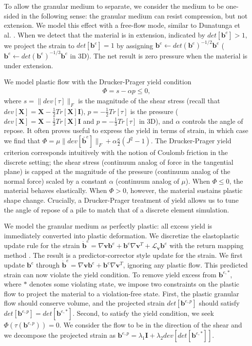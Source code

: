 To allow the granular medium to separate, we consider the medium to be one-sided in the following sense: the granular medium can resist compression, but not extension. We model this effect with a free-flow mode, similar to Dunatunga et al. \cite{Dunatunga:2015:Continuum}. When we detect that the material is in extension, indicated by $det[\bm{b}^e] > 1$, we project the strain to $det[\bm{b}^e] = 1$ by assigning $\bm{b}^e \leftarrow det\left( \bm{b}^e \right)^{-1/2} \bm{b}^e$ ($\bm{b}^e \leftarrow det\left( \bm{b}^e \right)^{-1/3} \bm{b}^e$ in 3D). The net result is zero pressure when the material is under extension.

We model plastic flow with the Drucker-Prager yield condition
\begin{align}
\Phi = s - \alpha p \leq 0,
\end{align}
where $s = \| dev[\tau] \|_F$ is the magnitude of the shear stress (recall that $dev[\bm{X}] = \bm{X} - \frac{1}{2} Tr[\bm{X}] \bm{I}$), $p = -\frac{1}{2}Tr[\tau]$ is the pressure ($dev[\bm{X}] = \bm{X} - \frac{1}{3} Tr[\bm{X}] \bm{I}$ and $p = -\frac{1}{3}Tr[\tau]$ in 3D), and $\alpha$ controls the angle of repose. It often proves useful to express the yield in terms of strain, in which case we find that $\Phi = \mu \|  dev[ \bar{\bm{b}}^e ] \|_F + \alpha \frac{\kappa}{2} \left( J^2 - 1 \right)$. The Drucker-Prager yield criterion corresponds intuitively with the notion of Coulomb friction in the discrete setting; the shear stress (continuum analog of force in the tangential plane) is capped at the magnitude of the pressure (continuum analog of the normal force) scaled by a constant $\alpha$ (continuum analog of $\mu$). When $\Phi \leq 0$, the material behaves elastically. When $\Phi > 0$, however, the material sustains plastic shape change. Crucially, a Drucker-Prager treatment of yield allows us to tune the angle of repose of a pile to match that of a discrete element simulation.

We model the granular medium as perfectly plastic: all excess yield is immediately converted into plastic deformation. We discretize the elastoplastic update rule for the strain $\dot{\bm{b}}^e = \nabla \bm{v} \bm{b}^e + \bm{b}^e \nabla \bm{v}^T + \mathcal{L}_{\bm{v}} \bm{b}^e$ with the return mapping method \cite{Simo:1998}. The result is a predictor-corrector style update for the strain. We first update $\bm{b}^{e}$ through $\dot{\bm{b}}^e = \nabla \bm{v} \bm{b}^e + \bm{b}^e \nabla \bm{v}^T$, ignoring any plastic flow. This predicted strain can now violate the yield condition. To remove yield excess from $\bm{b}^{e,*}$, where $*$ denotes some violating state, we impose two constraints on the plastic flow to project the material to a violation-free state. First, the plastic granular flow should conserve volume, and the projected strain $det[\bm{b}^{e,p}]$ should satisfy $det[\bm{b}^{e,p}] = det[\bm{b}^{e,*}]$. Second, to satisfy the yield condition, we seek $\Phi\left( \tau\left( \bm{b}^{e,p} \right) \right) = 0$. We consider the flow to be in the direction of the shear and we decompose the projected strain as $\bm{b}^{e,p} = \lambda_1 \bm{I} + \lambda_2 dev[det[\bm{b}^{e,*}]]$.

